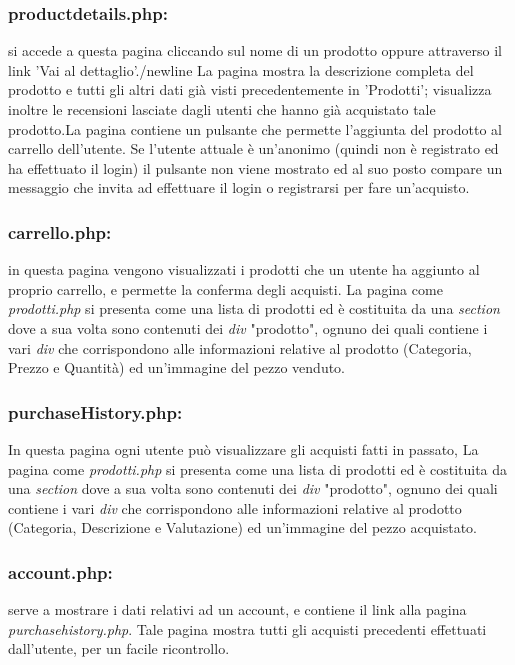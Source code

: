 \subsubsection{productdetails.php:} \Spazio si accede a questa pagina cliccando sul nome di un prodotto oppure attraverso il link 'Vai al dettaglio'./newline La pagina mostra la descrizione completa del prodotto e tutti gli altri dati già visti precedentemente in 'Prodotti'; visualizza inoltre le recensioni lasciate dagli utenti che hanno già acquistato tale prodotto.\newline La pagina contiene un pulsante che permette l'aggiunta del prodotto al carrello dell'utente. Se l'utente attuale è un'anonimo (quindi non è registrato ed ha effettuato il login) il pulsante non viene mostrato ed al suo posto compare un messaggio che invita ad effettuare il login o registrarsi per fare un'acquisto. 

\subsubsection{carrello.php:} \Spazio in questa pagina vengono visualizzati i prodotti che un utente ha aggiunto al proprio carrello, e permette la conferma degli acquisti. La pagina come \emph{prodotti.php} si presenta come una lista di prodotti ed è costituita da una \emph{section} dove a sua volta sono contenuti dei \emph{div} "prodotto", ognuno dei quali contiene i vari \emph{div} che corrispondono alle informazioni relative al prodotto (Categoria, Prezzo e Quantità) ed un'immagine del pezzo venduto.

\subsubsection{purchaseHistory.php:} \Spazio
In questa pagina ogni utente può visualizzare gli acquisti fatti in passato, La pagina come \emph{prodotti.php} si presenta come una lista di prodotti ed è costituita da una \emph{section} dove a sua volta sono contenuti dei \emph{div} "prodotto", ognuno dei quali contiene i vari \emph{div} che corrispondono alle informazioni relative al prodotto (Categoria, Descrizione e Valutazione) ed un'immagine del pezzo acquistato.

\subsubsection{account.php:} \Spazio serve a mostrare i dati relativi ad un account, e contiene il link alla pagina \textit{purchasehistory.php}.
Tale pagina mostra tutti gli acquisti precedenti effettuati dall'utente, per un facile ricontrollo.

